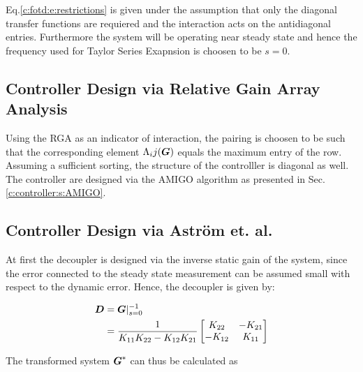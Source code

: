 Eq.\ref{c:fotd:e:restrictions} is given under the assumption that only the diagonal transfer functions are requiered and the interaction acts on the antidiagonal entries. Furthermore the system will be operating near steady state and hence the frequency used for Taylor Series Exapnsion is choosen to be $s = 0$.

\subsection{Controller Design via Relative Gain Array Analysis}
\label{c:fotd:su:rga}

Using the RGA as an indicator of interaction, the pairing is choosen to be such that the corresponding element $\Lambda_ij(\mbox{\boldmath$G$})$ equals the maximum entry of the row. Assuming a sufficient sorting, the structure of the controlller is diagonal as well. The controller are designed via the AMIGO algorithm as presented in Sec.\ref{c:controller:s:AMIGO}.\\

\subsection{Controller Design via Astr\"om et. al.}
\label{c:fotd:su:astrom}

At first the decoupler is designed via the inverse static gain of the system, since the error connected to the steady state measurement can be assumed small with respect to the dynamic error. Hence, the decoupler is given by:

\begin{align}
\begin{split}
\mbox{\boldmath$D$} &= \mbox{\boldmath$G$}|_{s=0}^{-1}\\
&= \frac{1}{K_{11}K_{22}-K_{12}K_{21}} 
\begin{bmatrix}
K_{22} & -K_{21} \\
-K_{12} & K_{11}
\end{bmatrix}
\end{split}
\label{c:fotd:e:exampleDecoupler}
\end{align}

The transformed system $\mbox{\boldmath$G$}^*$ can thus be calculated as

